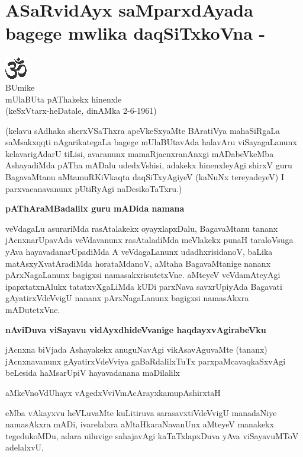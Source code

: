 \chapter{ASaRvidAyx saMparxdAyada bagege mwlika daqSiTxkoVna - }

\begin{center}
{\includegraphics[scale=.9]{om.eps}}\\[2pt]
BUmike\\[2pt]
mUlaBUta pAThakekx hinenxle\\[2pt]
(keSxVtarx-heDatale, dinAMka 2-6-1961)
\end{center}

\noindent
(kelavu sAdhaka sherxVSaThxra apeVkeSxyaMte BAratiVya mahaSiRgaLa saMsakxqqti nAgarikategaLa bagege mUlaBUtavAda halavAru viSayagaLanunx kelavarigAdarU tiLisi, avaranunx mamaRjacnxranAnxgi mADabeVkeMba AshayadiMda pATha mADalu udedxVshisi, adakekx hinenxleyAgi shirxV guru BagavaMtanu aMtamuRKiVkaqta daqSiTxyAgiyeV (kaNuNx tereyadeyeV) I parxvacanavanunx pUtiRyAgi naDesikoTaTxru.)


{\bigskip
\noindent
{\large\bf pAThAraMBadalilx guru mADida namana}}\label{page64}
\medskip

\noindent
veVdagaLu asurariMda rasAtalakekx oyayxlapxDalu, BagavaMtanu tananx jAcnxnarUpavAda veVdavanunx rasAtaladiMda meVlakekx punaH taraloVsuga yAva hayavadanarUpadiMda A veVdagaLanunx udadhxrisidanoV, baLika matAsxyXvatAradiMda horataMdanoV, aMtaha BagavaMtanige nananx pArxNagaLanunx bagigxsi namasakxrisutetxVne. aMteyeV veVdamAteyAgi ipapxtatxnAlukx tatatxvXgaLiMda kUDi parxNava savxrUpiyAda Bagavati gAyatirxVdeVvigU nananx pArxNagaLanunx bagigxsi namasAkxra mADutetxVne.

{\bigskip
\noindent
{\large\bf nAviDuva viSayavu vidAyxdhideVvanige haqdayxvAgirabeVku}}\label{page64a}
\medskip

\noindent
jAcnxna biVjada Ashayakekx anuguNavAgi vikAsavAguvaMte (tananx) jAcnxnavanunx gAyatirxVdeVviya gaBaRdalilxTuTx parxpaMcavaqkaSxvAgi beLesida haMsarUpiV hayavadanana maDilalilx

\begin{shloka}
aMkeVnoVdUhayx vAgedxVviVmAcArayxkamupAshirxtaH\label{page64b}
\end{shloka} 

\noindent
eMba vAkayxvu heVLuvaMte kuLitiruva sarasavxtiVdeVvigU manadaNiye namasAkxra mADi, ivarelalxra aMtaHkaraNavanUnx aMteyeV manakekx tegedukoMDu, adara niluvige sahajavAgi kaTaTxlapxDuva yAva viSayavuMToV adelalxvU, 

